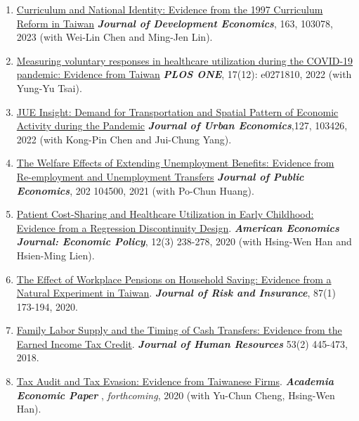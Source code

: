 \documentclass[10pt,letterpaper]{article}
\begin{document}
\begin{enumerate}
\item
\href{https://www.dropbox.com/s/lz3pqw0rozyn68r/knowing_taiwan_ver_2017_08_tzu_ting_v58.pdf?dl=0}{Curriculum and National Identity: Evidence from the 1997 Curriculum Reform in Taiwan} \textit{\textbf{Journal of Development Economics}}, 163, 103078, 2023 (with Wei-Lin Chen and Ming-Jen Lin).

\item
\href{https://doi.org/10.1371/journal.pone.0271810}{Measuring voluntary responses in healthcare utilization during the COVID-19 pandemic: Evidence from Taiwan}  \textit{\textbf{PLOS ONE}}, 17(12): e0271810, 2022 (with Yung-Yu Tsai).


\item
\href{https://www.dropbox.com/s/etfzl98k6d83ef5/Spontaneous_Population_Mobility_v23.pdf?dl=0}{JUE Insight: Demand for Transportation and Spatial Pattern of Economic Activity during the Pandemic} \textit{\textbf{Journal of Urban Economics}},127, 103426, 2022 (with Kong-Pin Chen and Jui-Chung Yang).

\item
\href{https://www.dropbox.com/s/4bmmsvl2mko0thu/Optimal_UI_Tzu_Ting_v142.pdf?dl=0}{The Welfare Effects of Extending Unemployment Benefits: Evidence from Re-­employment and Unemployment Transfers} \textit{\textbf{Journal of Public Economics}}, 202 104500, 2021 (with Po-Chun Huang).

\item \href{https://www.dropbox.com/s/pe5n9a74avtwk6v/Children_copay_v176_parametric.pdf?dl=0}{Patient Cost-Sharing and Healthcare Utilization in Early Childhood: Evidence from a Regression Discontinuity Design}.
\textit{\textbf{American Economics Journal: Economic Policy}}, 12(3) 238-278, 2020 (with Hsing-Wen Han and Hsien-Ming Lien).

\item
\href{https://www.dropbox.com/s/i792d6jutss65b2/Proposal_pension_saving_JRI_v91_final.pdf?dl=0}{The Effect of Workplace Pensions on Household Saving: Evidence from a Natural Experiment in Taiwan}.
\textit{\textbf{Journal of Risk and Insurance}}, 87(1) 173-194, 2020.

\item \href{http://jhr.uwpress.org/content/early/2017/03/01/jhr.53.2.0115-6857R1.abstract}{Family Labor Supply and the Timing of Cash Transfers: Evidence from the Earned Income Tax Credit}.
\textit{\textbf{Journal of Human Resources}} 53(2) 445-473, 2018.

\item
\href{https://www.dropbox.com/s/z5b267cu72o6xlg/tot_wage_v63_olo_revised.pdf?dl=0}{Tax Audit and Tax Evasion: Evidence from Taiwanese Firms}. \textit{\textbf{Academia Economic Paper }}, \textit{forthcoming}, 2020 (with Yu-Chun Cheng, Hsing-Wen Han).



\end{enumerate}
\end{document}
